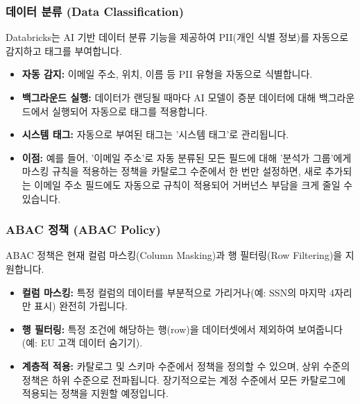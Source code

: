 \documentclass[11pt,a4paper]{article}
\theoremstyle{definition}
\begin{document}
\subsubsection*{데이터 분류 (Data Classification)}
Databricks는 AI 기반 데이터 분류 기능을 제공하여 PII(개인 식별 정보)를 자동으로 감지하고 태그를 부여합니다.
\begin{itemize}
    \item \textbf{자동 감지:} 이메일 주소, 위치, 이름 등 PII 유형을 자동으로 식별합니다.
    \item \textbf{백그라운드 실행:} 데이터가 랜딩될 때마다 AI 모델이 증분 데이터에 대해 백그라운드에서 실행되어 자동으로 태그를 적용합니다.
    \item \textbf{시스템 태그:} 자동으로 부여된 태그는 '시스템 태그'로 관리됩니다.
    \item \textbf{이점:} 예를 들어, '이메일 주소'로 자동 분류된 모든 필드에 대해 '분석가 그룹'에게 마스킹 규칙을 적용하는 정책을 카탈로그 수준에서 한 번만 설정하면, 새로 추가되는 이메일 주소 필드에도 자동으로 규칙이 적용되어 거버넌스 부담을 크게 줄일 수 있습니다.
\end{itemize}

\subsubsection*{ABAC 정책 (ABAC Policy)}
ABAC 정책은 현재 컬럼 마스킹(Column Masking)과 행 필터링(Row Filtering)을 지원합니다.
\begin{itemize}
    \item \textbf{컬럼 마스킹:} 특정 컬럼의 데이터를 부분적으로 가리거나(예: SSN의 마지막 4자리만 표시) 완전히 가립니다.
    \item \textbf{행 필터링:} 특정 조건에 해당하는 행(row)을 데이터셋에서 제외하여 보여줍니다 (예: EU 고객 데이터 숨기기).
    \item \textbf{계층적 적용:} 카탈로그 및 스키마 수준에서 정책을 정의할 수 있으며, 상위 수준의 정책은 하위 수준으로 전파됩니다. 장기적으로는 계정 수준에서 모든 카탈로그에 적용되는 정책을 지원할 예정입니다.
\end{itemize}
\end{document}
